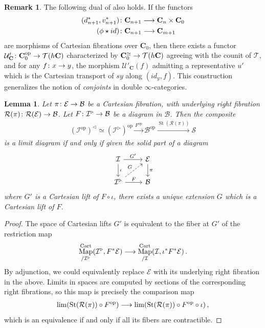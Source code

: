 \documentclass[10pt]{amsart}
\numberwithin{equation}{section}
\newtheorem{lem}[prop]{Lemma}
\theoremstyle{definition}
\newtheorem{rem}[prop]{Remark}
\DeclareMathOperator{\Map}{Map}
\DeclareMathOperator{\op}{op}
\DeclareMathOperator{\St}{St}
\DeclareMathOperator{\Cart}{Cart}
\newcommand{\cB}{\mathcal{B}}
\newcommand{\cE}{\mathcal{E}}
\newcommand{\cI}{\mathcal{I}}
\newcommand{\cS}{\mathcal{S}}
\newcommand{\cR}{\mathcal{R}}
\newcommand{\cT}{\mathcal{T}}
\newcommand{\cU}{\mathcal{U}}
\newcommand{\bfC}{\mathbf{C}}
\newcommand{\join}{\star}
\renewcommand{\to}{\mathchoice{\longrightarrow}{\rightarrow}{}{}}
\begin{document}
	\begin{rem}\label{rem:conjoints}
		The following dual of  also holds. If the functors
		\begin{align*}
			(d_{n+1}^{*}, v_{n+1}^{*})\colon \bfC_{n+1} &\to \bfC_{n} \times \bfC_{0} \\
			(\phi\join id)\colon \bfC_{n+1} &\to \bfC_{m+1}
		\end{align*}
		are morphisms of Cartesian fibrations over $\bfC_{0}$, then there exists a functor $\cU'_{\bfC} \colon \bfC_{0}^{\op} \to \cT(h\bfC)$ characterized by $\bfC_{0}^{\simeq} \to \cT(h\bfC)$ agreeing with the counit of $\cT$, and for any $f\colon x\to y$, the morphism $\cU'_{\bfC}(f)$ admitting a representative $u'$ which is the Cartesian transport of $sy$ along $(id_{y}, f)$.
    This construction generalizes the notion of \emph{conjoints} in double $\infty$-categories.
	\end{rem}
	\begin{lem}\label{lem:limts_as_lifting}
		Let $\pi \colon \cE \to \cB$ be a Cartesian fibration, with underlying right fibration $\cR(\pi) \colon \cR(\cE) \to \cB$. Let $F\colon \cI^{\triangleright} \to \cB$ be a diagram in $\cB$.
    Then the composite
		\begin{align*}
			(\cI^{\op})^{\triangleleft} \simeq (\cI^{\triangleright})^{\op} \xrightarrow{F^{\op}} \cB^{\op} \xrightarrow{\St(\cR(\pi))} \cS
		\end{align*}
		is a limit diagram if and only if given the solid part of a diagram
		\begin{equation}\label{eq:cartesian_lifting_problem}
			\begin{tikzcd}
				\cI \arrow[r, "G'"] \arrow[d, "\iota"]      &   \cE  \arrow[d, "\pi"] \\
				\cI^{\triangleright}  \arrow[r, "F"]    \arrow[ur,"G", dashed]          &   \cB
			\end{tikzcd}
		\end{equation}
		where $G'$ is a Cartesian lift of $F\circ \iota$, there exists a unique extension $G$ which is a Cartesian lift of $F$.
	\end{lem}

	\begin{proof}
		The space of Cartesian lifts $G'$ is equivalent to the fiber at $G'$ of the restriction map
		\begin{align*}
			\Map_{/\cI^{\triangleright}}^{\Cart}(\cI^{\triangleright}, F^{*}\cE) \to \Map_{/\cI}^{\Cart}(\cI, \iota^{*}F^{*}\cE) \,.
		\end{align*}
		By adjunction, we could equivalently replace $\cE$ with its underlying right fibration in the above.
    Limits in spaces are computed by sections of the corresponding right fibrations, so this map is precisely the comparison map
		\begin{align*}
			\lim( \St(\cR(\pi))\circ F^{\op}  ) \to \lim( \St(\cR(\pi))\circ F^{\op} \circ \iota )\,,
		\end{align*}
		which is an equivalence if and only if all its fibers are contractible.
	\end{proof}
\end{document}
